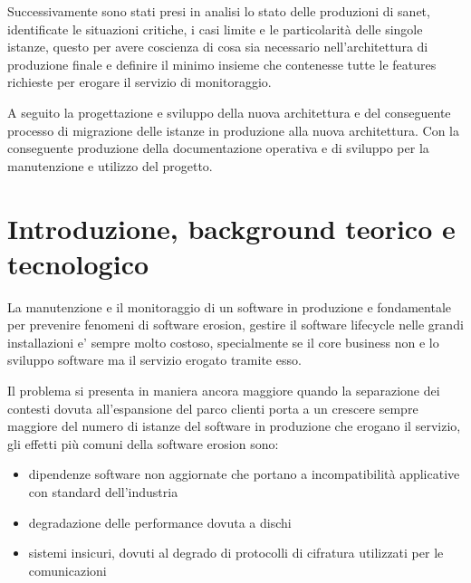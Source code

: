 \documentclass[12pt,a4paper,twoside,openright]{book}
\begin{document}
Successivamente sono stati presi in analisi lo stato delle produzioni di sanet, identificate le situazioni critiche, i casi limite e le particolarità delle singole istanze, questo per avere coscienza di cosa sia necessario nell'architettura di produzione finale e definire il minimo insieme che contenesse tutte le features richieste per erogare il servizio di monitoraggio.

A seguito la progettazione e sviluppo della nuova architettura e del conseguente processo di migrazione delle istanze in produzione alla nuova architettura. Con la conseguente produzione della documentazione operativa e di sviluppo per la manutenzione e utilizzo del progetto.

\newpage

\tableofcontents

\newpage

\listoffigures

\mainmatter

\pagestyle{fancy}
\fancyhead[LO]{\nouppercase{\rightmark}}
\fancyhead[RE]{\nouppercase{\leftmark}}
\fancyhead[LE,RO]{\thepage}
\fancyfoot{}

\chapter{Introduzione, background teorico e tecnologico}

La manutenzione e il monitoraggio di un software in produzione e fondamentale per prevenire fenomeni di software erosion, gestire il software lifecycle nelle grandi installazioni e' sempre molto costoso, specialmente se il core business non e lo sviluppo software ma il servizio erogato tramite esso.

Il problema si presenta in maniera ancora maggiore quando la separazione dei contesti dovuta all'espansione del parco clienti porta a un crescere sempre maggiore del numero di istanze del software in produzione che erogano il servizio, gli effetti più comuni della software erosion sono:

\begin{itemize}
    \item dipendenze software non aggiornate che portano a incompatibilità applicative con standard dell'industria
    \item degradazione delle performance dovuta a dischi
    \item sistemi insicuri, dovuti al degrado di protocolli di cifratura utilizzati per le comunicazioni
\end{itemize}
\end{document}
